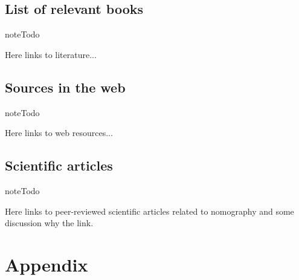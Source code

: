 \documentclass[a4paper,11pt,english]{sphinxmanual}
\begin{document}
\section{List of relevant books}
\label{literature/literature:list-of-relevant-books}
\begin{notice}{note}{Todo}

Here links to literature...
\end{notice}


\section{Sources in the web}
\label{literature/literature:sources-in-the-web}
\begin{notice}{note}{Todo}

Here links to web resources...
\end{notice}


\section{Scientific articles}
\label{literature/literature:scientific-articles}
\begin{notice}{note}{Todo}

Here links to peer-reviewed scientific articles related to nomography and some discussion why the link.
\end{notice}


\chapter{Appendix}
\label{appendix/appendices:appendix}\label{appendix/appendices::doc}
\end{document}
